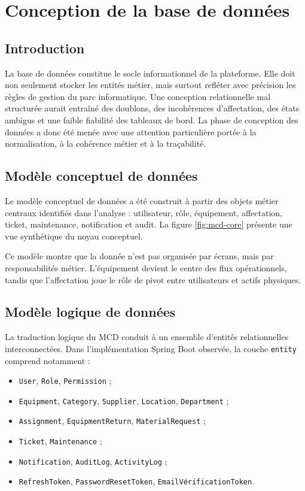 ﻿\chapter{Conception de la base de données}
\label{chap:database}

\section{Introduction}
La base de données constitue le socle informationnel de la plateforme. Elle doit non seulement stocker les entités métier, mais surtout refléter avec précision les règles de gestion du parc informatique. Une conception relationnelle mal structurée aurait entraîné des doublons, des incohérences d'affectation, des états ambigus et une faible fiabilité des tableaux de bord. La phase de conception des données a donc été menée avec une attention particulière portée à la normalisation, à la cohérence métier et à la traçabilité.

\section{Modèle conceptuel de données}
Le modèle conceptuel de données a été construit à partir des objets métier centraux identifiés dans l'analyse : utilisateur, rôle, équipement, affectation, ticket, maintenance, notification et audit. La figure \ref{fig:mcd-core} présente une vue synthétique du noyau conceptuel.


Ce modèle montre que la donnée n'est pas organisée par écrans, mais par responsabilités métier. L'équipement devient le centre des flux opérationnels, tandis que l'affectation joue le rôle de pivot entre utilisateurs et actifs physiques.

\section{Modèle logique de données}
La traduction logique du MCD conduit à un ensemble d'entités relationnelles interconnectées. Dans l'implémentation Spring Boot observée, la couche \texttt{entity} comprend notamment :
\begin{itemize}
  \item \texttt{User}, \texttt{Role}, \texttt{Permission} ;
  \item \texttt{Equipment}, \texttt{Category}, \texttt{Supplier}, \texttt{Location}, \texttt{Department} ;
  \item \texttt{Assignment}, \texttt{EquipmentReturn}, \texttt{MaterialRequest} ;
  \item \texttt{Ticket}, \texttt{Maintenance} ;
  \item \texttt{Notification}, \texttt{AuditLog}, \texttt{ActivityLog} ;
  \item \texttt{RefreshToken}, \texttt{PasswordResetToken}, \texttt{EmailVérificationToken}.
\end{itemize}

